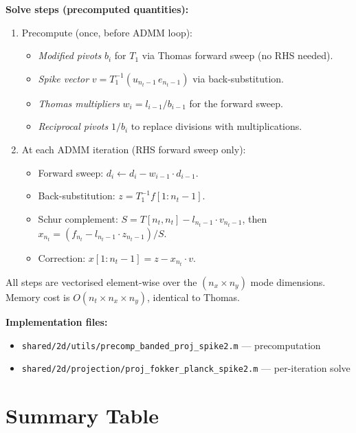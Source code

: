 \documentclass[11pt]{article}
\begin{document}
\textbf{Solve steps (precomputed quantities):}
\begin{enumerate}
  \item Precompute (once, before ADMM loop):
    \begin{itemize}
      \item \textit{Modified pivots} $b_i$ for $T_1$ via Thomas forward sweep (no RHS needed).
      \item \textit{Spike vector} $v = T_1^{-1} (u_{n_t-1} \, e_{n_t-1})$ via back-substitution.
      \item \textit{Thomas multipliers} $w_i = l_{i-1}/b_{i-1}$ for the forward sweep.
      \item \textit{Reciprocal pivots} $1/b_i$ to replace divisions with multiplications.
    \end{itemize}
  \item At each ADMM iteration (RHS forward sweep only):
    \begin{itemize}
      \item Forward sweep: $d_i \leftarrow d_i - w_{i-1} \cdot d_{i-1}$.
      \item Back-substitution: $z = T_1^{-1} f[1:n_t-1]$.
      \item Schur complement: $S = T[n_t,n_t] - l_{n_t-1} \cdot v_{n_t-1}$, then $x_{n_t} = (f_{n_t} - l_{n_t-1} \cdot z_{n_t-1}) / S$.
      \item Correction: $x[1:n_t-1] = z - x_{n_t} \cdot v$.
    \end{itemize}
\end{enumerate}
All steps are vectorised element-wise over the $(n_x \times n_y)$ mode dimensions.
Memory cost is $O(n_t \times n_x \times n_y)$, identical to Thomas.

\textbf{Implementation files:}
\begin{itemize}
  \item \texttt{shared/2d/utils/precomp\_banded\_proj\_spike2.m} --- precomputation
  \item \texttt{shared/2d/projection/proj\_fokker\_planck\_spike2.m} --- per-iteration solve
\end{itemize}

\section{Summary Table}
\end{document}
